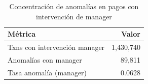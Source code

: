 \begin{table}[htbp]
\centering
\small
\caption{Concentración de anomalías en pagos con intervención de manager}
\label{tab:posthoc-manager}
\begin{tabular}{lr}
\toprule
Métrica & Valor \\
\midrule
  Txns con intervención manager & 1,430,740 \\
  Anomalías con manager & 89,811 \\
  Tasa anomalía (manager) & 0.0628 \\
\bottomrule
\end{tabular}
\end{table}
